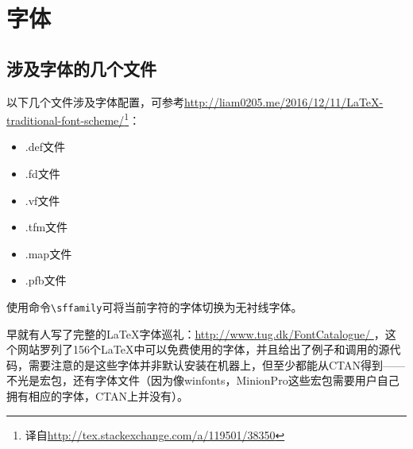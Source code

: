 \section{字体}
\subsection{涉及字体的几个文件}

以下几个文件涉及字体配置，可参考\url{http://liam0205.me/2016/12/11/LaTeX-traditional-font-scheme/}\footnote{译自\url{http://tex.stackexchange.com/a/119501/38350}}：
\begin{itemize}
	\item .def文件
	\item .fd文件 
	\item .vf文件
	\item .tfm文件
	\item .map文件
	\item .pfb文件
\end{itemize}

使用命令\verb|\sffamily|可将当前字符的字体切换为无衬线字体。

早就有人写了完整的LaTeX字体巡礼：\url{http://www.tug.dk/FontCatalogue/ }，这个网站罗列了156个LaTeX中可以免费使用的字体，并且给出了例子和调用的源代码，需要注意的是这些字体并非默认安装在机器上，但至少都能从CTAN得到——不光是宏包，还有字体文件（因为像winfonts，MinionPro这些宏包需要用户自己拥有相应的字体，CTAN上并没有）。 

